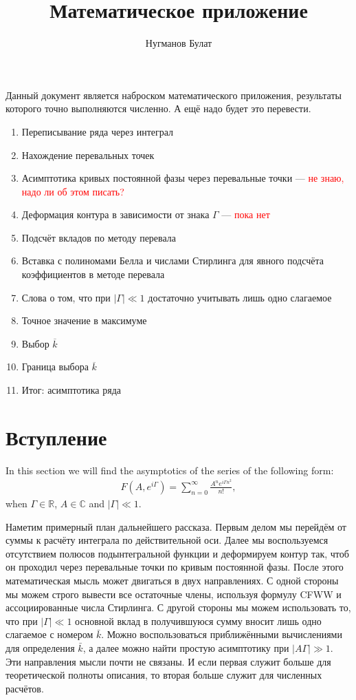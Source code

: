 \documentclass[a4paper, 12pt]{article}
\author{Нугманов Булат}
\title{Математическое приложение}
\newenvironment{eqw}{\begin{equation} \begin{aligned}}   
    {\end{aligned}    \end{equation}}
\begin{document}
\maketitle
Данный документ является наброском математического приложения, результаты которого точно выполняются численно. А ещё надо будет это перевести.

\begin{enumerate}
    \item Переписывание ряда через интеграл
    \item Нахождение перевальных точек
    \item Асимптотика кривых постоянной фазы через перевальные точки --- \textcolor{red}{не знаю, надо ли об этом писать?}
    \item Деформация контура в зависимости от знака $\Gamma$ --- \textcolor{red}{пока нет}
    \item Подсчёт вкладов по методу перевала
    \item Вставка с полиномами Белла и числами Стирлинга для явного подсчёта коэффициентов в методе перевала
    \item Слова о том, что при $|\Gamma| \ll 1$ достаточно учитывать лишь одно слагаемое
    \item Точное значение в максимуме
    \item Выбор $\overline{k}$
    \item Граница выбора $\overline{k}$
    \item Итог: асимптотика ряда
\end{enumerate}
\section*{Вступление}
In this section we will find the asymptotics of the series of the following form:
\begin{eqw}\label{F def}
    F(A, e^{i\Gamma}) = \sum\limits_{n=0}^{\infty} \frac{A^n e^{i\Gamma n^2}}{n!},
\end{eqw}
when $\Gamma\in \mathbb{R}$, $A\in \mathbb{C}$ and $|\Gamma| \ll 1$. 

Наметим примерный план дальнейшего рассказа. Первым делом мы перейдём от суммы к расчёту интеграла по действительной оси. Далее мы воспользуемся отсутствием полюсов подынтегральной функции и деформируем контур так, чтоб он проходил через перевальные точки по кривым постоянной фазы. 
После этого математическая мысль может двигаться в двух направлениях. С одной стороны мы можем строго вывести все остаточные члены, используя формулу CFWW и ассоциированные числа Стирлинга. С другой стороны мы можем использовать то, что при $|\Gamma| \ll 1$ основной вклад в получившуюся сумму вносит лишь одно слагаемое с номером $\bar k$. Можно воспользоваться приближёнными вычислениями для определения $\bar k$, а далее можно найти простую асимптотику при $|A\Gamma|\gg1$. Эти направления мысли почти не связаны. И если первая служит больше для теоретической полноты описания, то вторая больше служит для численных расчётов. 
\end{document}
